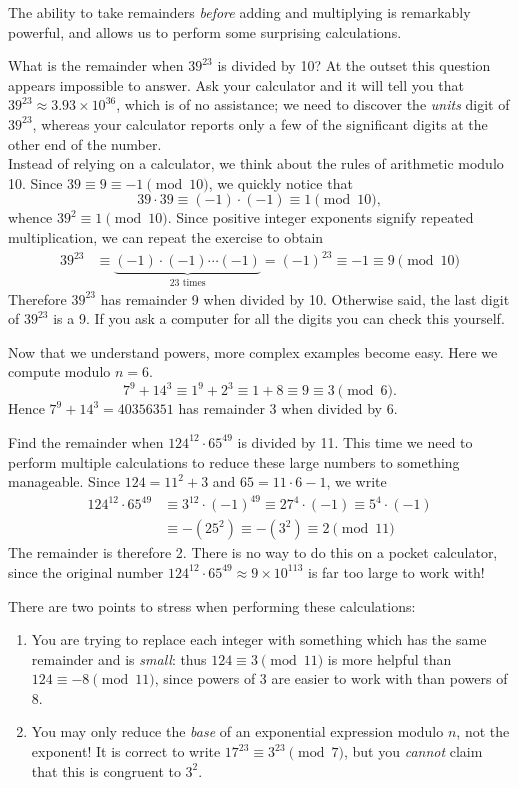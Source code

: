 \noindent The ability to take remainders \emph{before} adding and multiplying is remarkably powerful, and allows us to perform some surprising calculations.

\begin{examples}
	\item What is the remainder when $39^{23}$ is divided by 10? At the outset this question appears impossible to answer. Ask your calculator and it will tell you that $39^{23}\approx 3.93\times 10^{36}$, which is of no assistance; we need to discover the \emph{units} digit of $39^{23}$, whereas your calculator reports only a few of the significant digits at the other end of the number.\\
	Instead of relying on a calculator, we think about the rules of arithmetic modulo 10. Since $39\equiv 9\equiv -1\pmod{10}$, we quickly notice that
	\[39\cdot 39\equiv (-1)\cdot(-1)\equiv 1\pmod{10},\]
	whence $39^2\equiv 1\pmod{10}$. Since positive integer exponents signify repeated multiplication, we can repeat the exercise to obtain
	\begin{align*}
	39^{23}&\equiv \underbrace{(-1)\cdot(-1)\cdots(-1)}_{\text{23 times}}=(-1)^{23}\equiv -1\equiv 9\pmod{10}
	\end{align*}
	Therefore $39^{23}$ has remainder 9 when divided by 10. Otherwise said, the last digit of $39^{23}$ is a 9. If you ask a computer for all  the digits you can check this yourself.
  \item Now that we understand powers, more complex examples become easy. Here we compute modulo $n=6$.
  \[7^9+14^3\equiv 1^9+2^3\equiv 1+8\equiv 9\equiv 3\pmod 6.\]
  Hence $7^9+14^3=40356351$ has remainder 3 when divided by 6.
  \item Find the remainder when $124^{12}\cdot 65^{49}$ is divided by 11. This time we need to perform multiple calculations to reduce these large numbers to something manageable. Since $124=11^2+3$ and $65=11\cdot 6-1$, we write
  \begin{align*}
  124^{12}\cdot 65^{49}&\equiv 3^{12}\cdot(-1)^{49}\equiv 27^4\cdot(-1)\equiv 5^4\cdot(-1)\\
  &\equiv -(25^2)\equiv -(3^2)\equiv 2\pmod{11}
  \end{align*}
  The remainder is therefore 2. There is no way to do this on a pocket calculator, since the original number $124^{12}\cdot 65^{49}\approx 9\times 10^{113}$ is far too large to work with!
\end{examples}

\noindent There are two points to stress when performing these calculations:
\begin{enumerate}
  \item You are trying to replace each integer with something which has the same remainder and is \emph{small}: thus $124\equiv 3\pmod{11}$ is more helpful than $124\equiv -8\pmod{11}$, since powers of 3 are easier to work with than powers of 8.
  \item You may only reduce the \emph{base} of an exponential expression modulo $n$, not the exponent! It is correct to write $17^{23}\equiv 3^{23}\pmod 7$, but you \emph{cannot} claim that this is congruent to $3^2$.
\end{enumerate}


